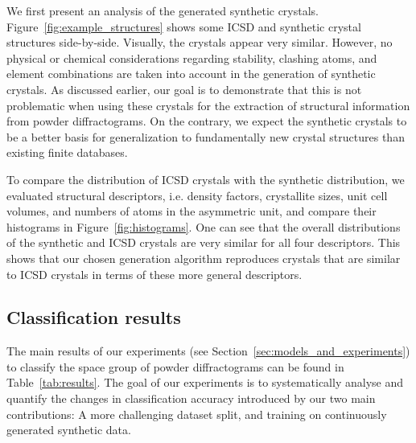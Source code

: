     We first present an analysis of the generated synthetic crystals.
    Figure~\ref{fig:example_structures} shows some  ICSD and
    synthetic crystal structures side-by-side. Visually, the crystals appear very
    similar. However, no physical or chemical considerations regarding stability, clashing atoms, and element combinations are taken into account in the generation of synthetic crystals. As discussed earlier, our goal is to demonstrate that this is
    not problematic when using these crystals for the extraction of structural
    information from powder diffractograms. On the contrary, we expect the synthetic crystals to be a better basis for generalization to fundamentally new crystal structures than existing finite databases.

    To compare the distribution of ICSD crystals with the synthetic
    distribution, we evaluated structural descriptors, i.e. density factors, crystallite sizes, unit cell volumes, and numbers of atoms in the asymmetric unit, and compare their histograms
    in Figure~\ref{fig:histograms}.
    One can see that the overall distributions of
    the synthetic and ICSD crystals are very similar for all four descriptors.
    This shows that our chosen generation algorithm reproduces crystals that are
    similar to ICSD crystals in terms of these more general descriptors.

    \subsection{Classification results} \label{sec:classification_results} 
    
    The main results of our experiments (see Section~\ref{sec:models_and_experiments}) to
    classify the space group of powder diffractograms can be
    found in Table~\ref{tab:results}. 
    The goal of our experiments is to systematically analyse and quantify the changes in classification accuracy introduced by our two main contributions: A more challenging dataset split, and training on continuously generated synthetic data.

